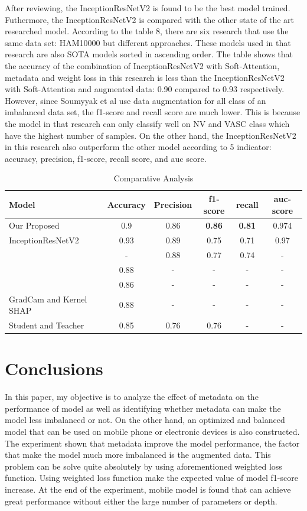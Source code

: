 \documentclass[sensors,article,submit,pdftex,moreauthors]{Definitions/mdpi}
\begin{document}
After reviewing, the InceptionResNetV2 is found to be the best model trained. Futhermore, the InceptionResNetV2 is compared with the other state of the art researched model. According to the table 8, there are six research that use the same data set: HAM10000 but different approaches. These models used in that research are also SOTA models sorted in ascending order. The table shows that the accuracy of the combination of InceptionResNetV2 with Soft-Attention, metadata and weight loss in this research is less than the InceptionResNetV2 with Soft-Attention and augmented data: 0.90 compared to 0.93 respectively. However, since Soumyyak et al use data augmentation for all class of an imbalanced data set, the f1-score and recall score are much lower. This is because the model in that research can only classify well on NV and VASC class which have the highest number of samples. On the other hand, the InceptionResNetV2 in this research also outperform the other model according to 5 indicator: accuracy, precision, f1-score, recall score, and auc score. 
\FloatBarrier
\begin{table}[H]
	\begin{tabular}{| p{4cm} | c | c | c | c | c |}
		\hline
		Model & Accuracy & Precision & f1-score & recall & auc-score\\
		\hline
		Our Proposed & 0.9	& 0.86 &\textbf{0.86} & \textbf{0.81} & 0.974\\
		\hline
		InceptionResNetV2\cite{03358} & 0.93 & 0.89 & 0.75 & 0.71 & 0.97\\
		\hline
		\cite{03798} & - & 0.88 & 0.77 & 0.74 & - \\
		\hline
		\cite{09418} & 0.88 & - & - & - & - \\
		\hline
		\cite{01284} & 0.86 & - & - & - & - \\
		\hline
		GradCam and Kernel SHAP\cite{06612} & 0.88 & - & - & - & - \\
		\hline
		Student and Teacher\cite{03225} & 0.85 & 0.76 & 0.76 & - & - \\
		\hline
	\end{tabular}
	\caption{Comparative Analysis}
	\label{table:comparative-analysis}
\end{table} 

\section{Conclusions}
In this paper, my objective is to analyze the effect of metadata on the performance of model as well as identifying whether metadata can make the model less imbalanced or not. On the other hand, an optimized and balanced model that can be used on mobile phone or electronic devices is also constructed. The experiment shown that metadata improve the model performance, the factor that make the model much more imbalanced is the augmented data. This problem can be solve quite absolutely by using aforementioned weighted loss function. Using weighted loss function make the expected value of model f1-score increase. At the end of the experiment, mobile model is found that can achieve great performance without either the large number of parameters or depth. 
\end{document}
